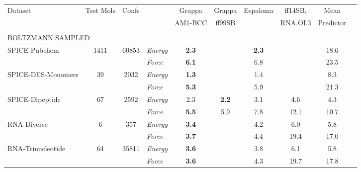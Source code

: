 \documentclass[varwidth]{standalone}
\newcommand{\widthbetweentype}{7pt}
\begin{document}
\begin{adjustbox}{width=\textwidth,center}
\centering

\renewcommand{\arraystretch}{1.0} %
\begin{tabular}{l c c l c c c c c c}
\hline
\hline
\multirow{2}{*}{Dataset} & \multirow{2}{*}{Test Mols} & \multirow{2}{*}{Confs} & & Grappa & Grappa & \multirow{2}{*}{Espaloma} & ff14SB, & Mean\\
& & & & AM1-BCC & ff99SB & & RNA.OL3 & Predictor\\
\hline
\multicolumn{8}{l}{\vspace{\widthbetweentype}} \\[-1em]
\multicolumn{8}{l}{\small{BOLTZMANN SAMPLED}} \\\hline
\multirow{2}{*}{SPICE-Pubchem} & \multirow{2}{*}{1411} & \multirow{2}{*}{60853} & \textit{Energy} & \textbf{2.3} &  & \textbf{2.3} &  & 18.6\\
                                   &                       &                         & \textit{Force}  & \textbf{6.1} &  & 6.8 &  & 23.5\\
\hline
\multirow{2}{*}{SPICE-DES-Monomers} & \multirow{2}{*}{39} & \multirow{2}{*}{2032} & \textit{Energy} & \textbf{1.3} &  & 1.4 &  & 8.3\\
                                   &                       &                         & \textit{Force}  & \textbf{5.3} &  & 5.9 &  & 21.3\\
\hline
\multirow{2}{*}{SPICE-Dipeptide} & \multirow{2}{*}{67} & \multirow{2}{*}{2592} & \textit{Energy} & 2.3 & \textbf{2.2} & 3.1 & 4.6 & 4.3\\
                                   &                       &                         & \textit{Force}  & \textbf{5.5} & 5.9 & 7.8 & 12.1 & 10.7\\
\hline
\multirow{2}{*}{RNA-Diverse} & \multirow{2}{*}{6} & \multirow{2}{*}{357} & \textit{Energy} & \textbf{3.4} &  & 4.2 & 6.0 & 5.8\\
                                   &                       &                         & \textit{Force}  & \textbf{3.7} &  & 4.4 & 19.4 & 17.0\\
\hline
\multirow{2}{*}{RNA-Trinucleotide} & \multirow{2}{*}{64} & \multirow{2}{*}{35811} & \textit{Energy} & \textbf{3.6} &  & 3.8 & 6.1 & 5.8\\
                                   &                       &                         & \textit{Force}  & \textbf{3.6} &  & 4.3 & 19.7 & 17.8\\

\end{tabular}
\end{adjustbox}
\end{document}

